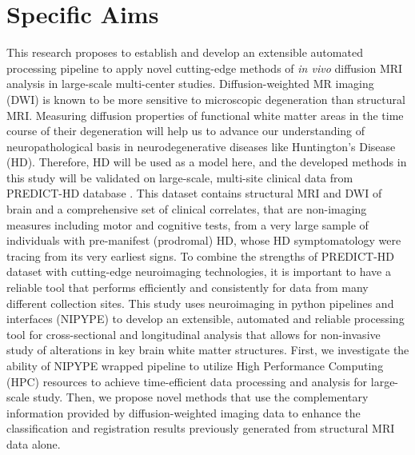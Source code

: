 \section{Specific Aims}
\label{specificAims}
\noindent This research proposes to establish and develop an extensible automated processing pipeline to apply novel cutting-edge methods of \textit{in vivo} diffusion MRI analysis in large-scale multi-center studies. 
\newline
\newline
Diffusion-weighted MR imaging (DWI) is known to be more sensitive to microscopic degeneration than structural MRI. Measuring diffusion properties of functional white matter areas in the time course of their degeneration will help us to advance our understanding of neuropathological basis in neurodegenerative diseases like Huntington's Disease (HD).
\newline
\newline
Therefore, HD will be used as a model here, and the developed methods in this study will be validated on large-scale, multi-site clinical data from PREDICT-HD database \cite{PREDICT_HD}. This dataset contains structural MRI and DWI of brain and a comprehensive set of clinical correlates, that are non-imaging measures including motor and cognitive tests, from a very large sample of individuals with pre-manifest (prodromal) HD, whose HD symptomatology were tracing from its very earliest signs. To combine the strengths of PREDICT-HD dataset with cutting-edge neuroimaging technologies, it is important to have a reliable tool that performs efficiently and consistently for data from many different collection sites.
\newline
\newline
This study uses neuroimaging in python pipelines and interfaces (NIPYPE) to
develop an extensible, automated and reliable processing tool for cross-sectional and longitudinal analysis that allows for non-invasive study of alterations in key brain white matter structures. 
\newline
\newline
First, we investigate the ability of NIPYPE wrapped pipeline to utilize High Performance Computing (HPC) resources to achieve time-efficient data processing and analysis for large-scale study. Then, we propose novel methods that use the complementary information provided by diffusion-weighted imaging data to enhance the classification and registration results previously generated from structural MRI data alone.
\newline

